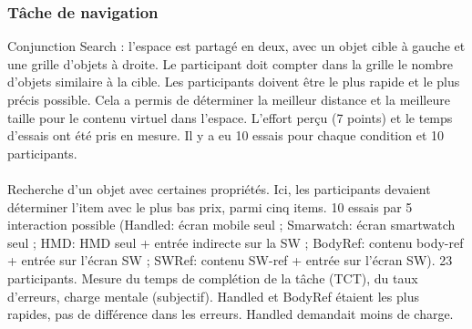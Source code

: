\subsubsection{Tâche de navigation}
Conjunction Search : l'espace est partagé en deux, avec un objet cible à gauche et une grille d'objets à droite. Le participant doit compter dans la grille le nombre d'objets similaire à la cible. Les participants doivent être le plus rapide et le plus précis possible. Cela a permis de déterminer la meilleur distance et la meilleure taille pour le contenu virtuel dans l'espace. L'effort perçu (7 points) et le temps d'essais ont été pris en mesure. Il y a eu 10 essais pour chaque condition et 10 participants. \cite{EnsFinneganIrani2014}\\
\cite{RashidNacentaQuigley2012}\\
Recherche d'un objet avec certaines propriétés. Ici, les participants devaient déterminer l'item avec le plus bas prix, parmi cinq items. 10 essais par 5 interaction possible (Handled: écran mobile seul ; Smarwatch: écran smartwatch seul ; HMD: HMD seul + entrée indirecte sur la SW ; BodyRef: contenu body-ref + entrée sur l'écran SW ; SWRef: contenu SW-ref + entrée sur l'écran SW). 23 participants. Mesure du temps de complétion de la tâche (TCT), du taux d'erreurs, charge mentale (subjectif). Handled et BodyRef étaient les plus rapides, pas de différence dans les erreurs. Handled demandait moins de charge. \cite{GrubertHeinischQuigleyEtAl2015}


